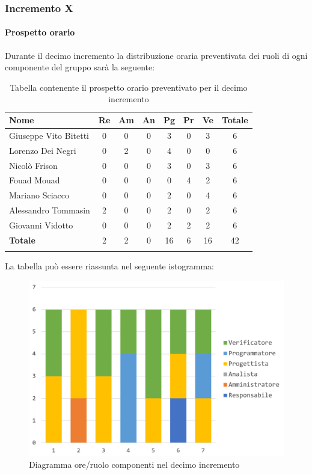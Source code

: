 		
	\subsubsection{Incremento X}
		\paragraph{Prospetto orario}
		Durante il decimo incremento la distribuzione oraria preventivata dei ruoli di ogni componente del gruppo sarà la seguente:
		
		\begin{longtable}{|l|c|c|c|c|c|c|c|}
			\hline
			\rowcolor{lighter-grayer}
			\textbf{Nome} & \textbf{Re} & \textbf{Am} & \textbf{An} & \textbf{Pg}  & \textbf{Pr}   & \textbf{Ve} & \textbf{Totale} \\
			\hline
			\endfirsthead
			
			\hline
			Giuseppe Vito Bitetti 		 & 0 & 0 & 0 & 3 & 0 & 3 & 6\\
			\hline
			\hline
			Lorenzo Dei Negri			 & 0 & 2 & 0 & 4 & 0 & 0 & 6\\
			\hline
			\hline
			Nicolò Frison				      & 0 & 0 & 0 & 3 & 0 & 3 & 6\\
			\hline
			\hline
			Fouad Mouad 				   & 0 & 0 & 0 & 0 & 4 & 2 & 6\\
			\hline
			\hline
			Mariano Sciacco 			 & 0 & 0 & 0 & 2 & 0 & 4 & 6\\
			\hline
			\hline
			Alessandro Tommasin    & 2 & 0 & 0 & 2 & 0 & 2 & 6\\
			\hline
			\hline
			Giovanni Vidotto 			  & 0 & 0 & 0 & 2 & 2 & 2 & 6\\
			\hline 
			\textbf{Totale}			 		& 2 & 2 & 0 & 16 & 6 & 16 & 42\\
			\hline
			\caption{Tabella contenente il prospetto orario preventivato per il decimo incremento}
		\end{longtable}
		
		La tabella può essere riassunta nel seguente istogramma:
		\begin{figure}[H]
			\centering
			\includegraphics[width=0.8\linewidth]{./images/preventivo/incremento10-1.png}
			\caption{Diagramma ore/ruolo componenti nel decimo incremento}
			\label{fig:diagramma suddivione ruoli incremento X}
		\end{figure}
		\pagebreak
		
